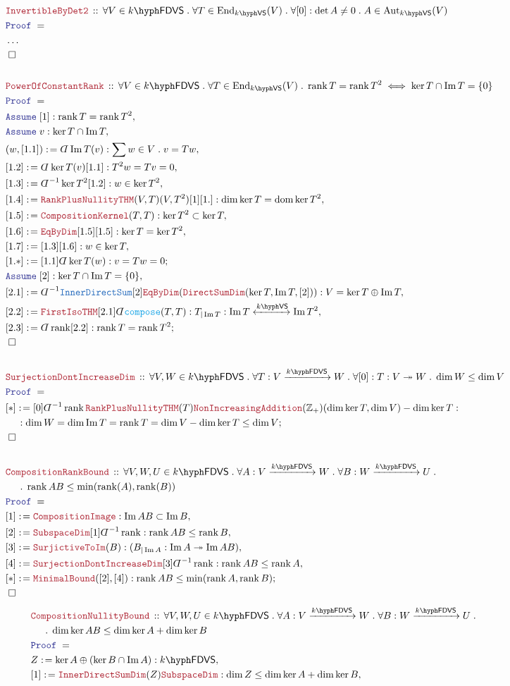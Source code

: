 \documentclass[12pt]{scrartcl}%
\newcommand{\TYPE}[1]{\textcolor{NavyBlue}{\mathtt{#1}}}%
\newcommand{\FUNC}[1]{\textcolor{Cerulean}{\mathtt{#1}}}%
\newcommand{\LOGIC}[1]{\textcolor{Blue}{\mathtt{#1}}}%
\newcommand{\THM}[1]{\textcolor{Maroon}{\mathtt{#1}}}%
\renewcommand{\.}{\; . \;} %
\newcommand{\de}{: \kern 0.1pc =} %
\newcommand{\Theorem}[2]{& \THM{#1} \, :: \, #2 \\ & \Proof = \\ } %
\newcommand{\NewLine}{\\ & \kern 1pc}%
\newcommand{\Page}[1]{ \begin{align*} #1 \end{align*}  }%
\newcommand{ \bd }{ \ByDef }%
\newcommand{\NoProof}{ & \ldots \\ \EndProof}%
\newcommand{\Int}{\mathbb{Z}}%
\DeclareMathOperator*{\im}{Im}%
\newcommand{\Aut}{\mathrm{Aut}}%
\newcommand{\End}{\mathrm{End}}%
\newcommand{\ToSurj}{\twoheadrightarrow} %
\newcommand{\Say}[3]{& #1 \de #2 : #3, \\} %
\newcommand{\Conclude}[3]{& #1 \de #2 : #3; \\}%
\newcommand{\Assume}[2]{& \LOGIC{Assume} \; #1 : #2, \\} %
\newcommand{\QED}{\; \square} %
\newcommand{\EndProof}{& \QED \\} %
\newcommand{\ByDef}{\rotatebox[origin=c]{-180}{$D$}}%
\newcommand{\Proof}{\LOGIC{Proof} \; } %
\newcommand{\Arrow}[1]{\xrightarrow{#1}}%
\newcommand{\ToIso}[1]{\xleftrightarrow{#1}}%
\DeclareMathOperator*{\dom}{dom} %
\DeclareMathOperator{\rank}{rank} %
\newcommand{\VS}[1]{#1\hyph\mathsf{VS}} %
\newcommand{\FDVS}[1]{#1\hyph\mathsf{FDVS}} %
\begin{document}
\Page{
	\Theorem{InvertibleByDet2}{\forall V \in \FDVS{k} \. \forall T \in \End_{\VS{k}}(V) \. \forall [0] : \det A \neq 0 \. A \in \Aut_{\VS{k}}(V)}
	\NoProof
	\\
	\Theorem{PowerOfConstantRank}{\forall V \in \FDVS{k} \. \forall T \in \End_{\VS{k}}(V) \. \rank T = \rank T^2 \iff \ker T \cap \im T = \{0\}} 
	\Assume{[1]}{\rank T = \rank T^2}
	\Assume{v}{\ker T \cap \im T}
	\Say{(w,[1.1])}{\bd \im T (v)}{\sum w \in V \. v = Tw}
	\Say{[1.2]}{\bd \ker T (v)[1.1]}{ T^2w = Tv = 0}
	\Say{[1.3]}{\bd^{-1}\ker T^2[1.2]}{w \in \ker T^2}
	\Say{[1.4]}{\THM{RankPlusNullityTHM}(V,T)(V,T^2)[1][1.]}{\dim \ker T = \dom \ker T^2}
	\Say{[1.5]}{\THM{CompositionKernel}(T,T)}{\ker T^2 \subset \ker T}
	\Say{[1.6]}{\THM{EqByDim}[1.5][1.5]}{\ker T = \ker T^2}
	\Say{[1.7]}{[1.3][1.6]}{w \in \ker T}
	\Conclude{[1.*]}{[1.1]\bd \ker T(w)}{ v = Tw = 0}
	\Assume{[2]}{\ker T \cap \im T = \{0\}}
	\Say{[2.1]}{\bd^{-1}\TYPE{InnerDirectSum}[2]\THM{EqByDim}(\THM{DirectSumDim}(\ker T,\im T,[2]))}
	{V = \ker T \oplus \im T }
	\Say{[2.2]}{\THM{FirstIsoTHM}[2.1]\bd \FUNC{compose}(T,T)}{T_{|\im T} : \im T \ToIso{\VS{k}} \im T^2}
	\Conclude{[2.3]}{\bd \rank [2.2]}{\rank T = \rank T^2}
	\EndProof
	\\
	\Theorem{SurjectionDontIncreaseDim}{\forall V,W \in \FDVS{k} \. \forall T : V \Arrow{\FDVS{k}} W \. 
		\forall [0] : T : V \ToSurj W \. \dim W \le \dim V  }
	\Conclude{[*]}{[0]\bd^{-1}\rank\THM{RankPlusNullityTHM}(T)\THM{NonIncreasingAddition}(\Int_+)(\dim \ker T,\dim V) - \dim \ker T}
	{\NewLine : \dim W = \dim \im T = \rank T = \dim V - \dim \ker T \le \dim V}
	\EndProof
	\\
	\Theorem{CompositionRankBound}{
		\forall V,W,U \in \FDVS{k} \.
		\forall A : V \Arrow{\FDVS{k}} W \.
		\forall B : W \Arrow{\FDVS{k}} U \. \NewLine \.
		\rank AB \le \min(\rank(A),\rank(B))
	}
	\Say{[1]}{\THM{CompositionImage}}{\im AB \subset \im B}
	\Say{[2]}{\THM{SubspaceDim}[1]\bd^{-1}\rank}{\rank AB \le \rank B}
	\Say{[3]}{\THM{SurjictiveToIm}(B)}{(B_{|\im A} : \im A \ToSurj \im AB)}
	\Say{[4]}{\THM{SurjectionDontIncreaseDim}[3]\bd^{-1}\rank}{ \rank AB \le \rank A}
	\Conclude{[*]}{\THM{MinimalBound}([2],[4])}{\rank AB \le \min(\rank A,\rank B)}
	\EndProof
}\Page{ 
	\Theorem{CompositionNullityBound}{
		\forall V,W,U \in \FDVS{k} \.
		\forall A : V \Arrow{\FDVS{k}} W \.
		\forall B : W \Arrow{\FDVS{k}} U \. \NewLine \. 
		\dim \ker AB \le \dim \ker A + \dim \ker B	
	}
	\Say{Z}{\ker A \oplus (\ker B \cap \im A)}{\FDVS{k}}
	\Say{[1]}{\THM{InnerDirectSumDim}(Z)\THM{SubspaceDim}}{\dim Z \le \dim \ker A + \dim \ker B }
}
\end{document}
